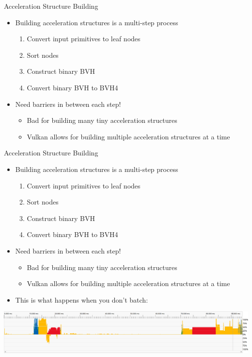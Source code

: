 \documentclass[aspectratio=169,t]{beamer}
\begin{document}
\begin{slide}{Acceleration Structure Building}
 \begin{itemize}
  \item Building acceleration structures is a multi-step process
  \begin{enumerate}
   \item Convert input primitives to leaf nodes
   \item Sort nodes
   \item Construct binary BVH
   \item Convert binary BVH to BVH4
  \end{enumerate}
  \item Need barriers in between each step!
  \begin{itemize}
   \item Bad for building many tiny acceleration structures
   \item Vulkan allows for building multiple acceleration structures at a time
  \end{itemize}
 \end{itemize}
\end{slide}

\begin{slide}{Acceleration Structure Building}
 \begin{itemize}
  \item Building acceleration structures is a multi-step process
  \begin{enumerate}
   \item Convert input primitives to leaf nodes
   \item Sort nodes
   \item Construct binary BVH
   \item Convert binary BVH to BVH4
  \end{enumerate}
  \item Need barriers in between each step!
  \begin{itemize}
   \item Bad for building many tiny acceleration structures
   \item Vulkan allows for building multiple acceleration structures at a time
  \end{itemize}
  \pause
  \item This is what happens when you don't batch:
 \end{itemize}
 \includegraphics[width=\textwidth]{graphics/mostperformantasbuild.png}
\end{slide}
\end{document}
